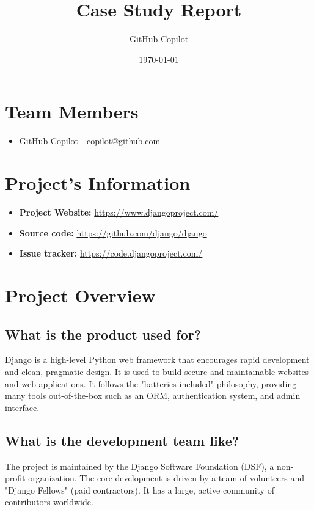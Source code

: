 \documentclass[10pt,a4paper]{article}
\title{\textbf{Case Study Report}}
\author{GitHub Copilot}
\date{\today}
\begin{document}
\maketitle

\section*{Team Members}
\begin{itemize}
    \item GitHub Copilot - \href{mailto:copilot@github.com}{copilot@github.com}
\end{itemize}

\section*{Project’s Information}
\begin{itemize}
    \item \textbf{Project Website:} \url{https://www.djangoproject.com/}
    \item \textbf{Source code:} \url{https://github.com/django/django}
    \item \textbf{Issue tracker:} \url{https://code.djangoproject.com/}
\end{itemize}

\section*{Project Overview}

\subsection*{What is the product used for?}
Django is a high-level Python web framework that encourages rapid development and clean, pragmatic design. It is used to build secure and maintainable websites and web applications. It follows the "batteries-included" philosophy, providing many tools out-of-the-box such as an ORM, authentication system, and admin interface.

\subsection*{What is the development team like?}
The project is maintained by the Django Software Foundation (DSF), a non-profit organization. The core development is driven by a team of volunteers and "Django Fellows" (paid contractors). It has a large, active community of contributors worldwide.
\end{document}
